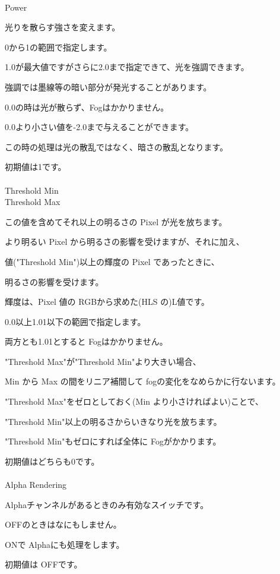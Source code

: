 \documentclass[a4paper,12pt]{article}
\begin{document}
\newpage

\thispagestyle{empty}

\ \vspace{-0.2em}
\par
\noindent Power\par
光りを散らす強さを変えます。\par
0から1の範囲で指定します。\par
1.0が最大値ですがさらに2.0まで指定できて、光を強調できます。\par
強調では墨線等の暗い部分が発光することがあります。\par
0.0の時は光が散らず、Fogはかかりません。\par
0.0より小さい値を-2.0まで与えることができます。\par
この時の処理は光の散乱ではなく、暗さの散乱となります。\par
初期値は1です。\\
\\
Threshold Min\\
Threshold Max\par
この値を含めてそれ以上の明るさの Pixel が光を放ちます。\\
\par
より明るい Pixel から明るさの影響を受けますが、それに加え、\par
値("Threshold Min")以上の輝度の Pixel であったときに、\par
明るさの影響を受けます。\par
輝度は、Pixel 値の RGBから求めた(HLS の)L値です。\\
\par
0.0以上1.01以下の範囲で指定します。\\
\par
両方とも1.01とすると Fogはかかりません。\\
\par
"Threshold Max"が"Threshold Min"より大きい場合、\par
Min から Max の間をリニア補間して fogの変化をなめらかに行ないます。\\
\par
"Threshold Max"をゼロとしておく(Min より小さければよい)ことで、\par
"Threshold Min"以上の明るさからいきなり光を放ちます。\par
"Threshold Min"もゼロにすれば全体に Fogがかかります。\\
\par
初期値はどちらも0です。\\
\\
Alpha Rendering\par
Alphaチャンネルがあるときのみ有効なスイッチです。\par
OFFのときはなにもしません。\par
ONで Alphaにも処理をします。\par
初期値は OFFです。
\end{document}
